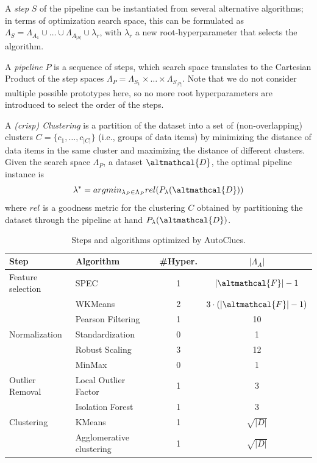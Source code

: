 A \textit{step} $S$ of the pipeline can be instantiated from several alternative algorithms; in terms of optimization search space, this can be formulated as $\Lambda_S = \Lambda_{A_1} \cup \ldots \cup \Lambda_{A_{|S|}} \cup \lambda_r$, with $\lambda_r$ a new root-hyperparameter that selects the algorithm.

A \textit{pipeline} $P$ is a sequence of steps, which search space translates to the Cartesian Product of the step spaces $\Lambda_P = \Lambda_{S_1} \times \ldots \times \Lambda_{S_{|P|}}$.
Note that we do not consider multiple possible prototypes here, so no more root hyperparameters are introduced to select the order of the steps.

A \textit{(crisp) Clustering} is a partition of the dataset into a set of (non-overlapping) clusters  $C=\{c_1, \ldots, c_{|C|}\}$ (i.e., groups of data items) by minimizing the distance of data items in the same cluster and maximizing the distance of different clusters.
Given the search space $\Lambda_P$, a dataset $\altmathcal{D}$, the optimal pipeline instance is
\begin{equation}
\label{eq:optimization}
    \lambda^* = argmin_{\lambda_P \in \Lambda_P} rel(P_{\lambda}(\altmathcal{D}))
\end{equation}
where $rel$ is a goodness metric for the clustering $C$ obtained by partitioning the dataset through the pipeline at hand $P_{\lambda}(\altmathcal{D})$.


\begin{table}[!ht]
    \centering
    \begin{tabular}{lp{5cm}cc}
        \hline
        Step     & Algorithm & \#Hyper. & $|\Lambda_A|$\\\hline
        Feature selection & SPEC \cite{zhao2007spectral} & 1 & $|\altmathcal{F}|-1$\\
         & WKMeans \cite{WKMeans} & 2 & $3 \cdot (|\altmathcal{F}|-1)$\\
         & Pearson Filtering & 1 & 10\\
        Normalization     & Standardization & 0 & 1\\
        & Robust Scaling & 3 & 12\\
        & MinMax & 0 & 1\\
        Outlier Removal   & Local Outlier Factor \cite{breunig2000lof} & 1 & 3\\
        & Isolation Forest \cite{liu2012isolation} & 1 & 3\\
        Clustering  & KMeans \cite{arthur2006k} & 1 & $\sqrt{|D|}$\\
        & Agglomerative clustering  \cite{murtagh2017algorithms} & 1 & $\sqrt{|D|}$\\\hline
    \end{tabular}
    \caption{Steps and algorithms optimized by AutoClues.}
    \label{clustering-tbl:processing}
\end{table}


